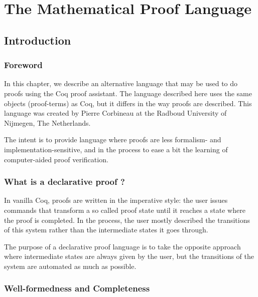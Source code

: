 \newcommand{\DPL}{Mathematical Proof Language}

\chapter{The \DPL\label{DPL}}

\section{Introduction}

\subsection{Foreword}

In this chapter, we describe an alternative language that may be used
to do proofs using the Coq proof assistant.  The language described
here uses the same objects (proof-terms) as Coq, but it differs in the
way proofs are described. This language was created by Pierre
Corbineau at the Radboud University of Nijmegen, The Netherlands.

The intent is to provide language where proofs are less formalism-{}
and implementation-{}sensitive, and in the process to ease a bit the
learning of computer-{}aided proof verification.

\subsection{What is a declarative proof ?{}}
In vanilla Coq, proofs are written in the imperative style: the user
issues commands that transform a so called proof state until it
reaches a state where the proof is completed. In the process, the user
mostly described the transitions of this system rather than the
intermediate states it goes through.

The purpose of a declarative proof language is to take the opposite
approach where intermediate states are always given by the user, but
the transitions of the system are automated as much as possible.

\subsection{Well-formedness and Completeness}

